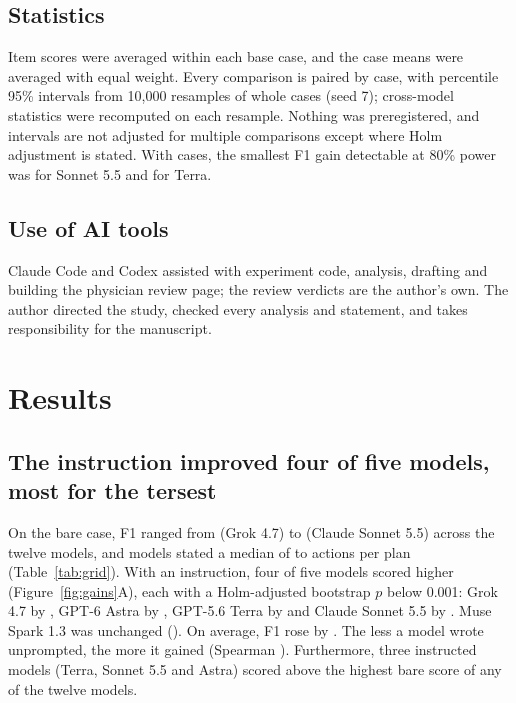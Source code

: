 \documentclass[11pt]{article}
\begin{document}
\subsection*{Statistics}
\label{sec:statistics}
Item scores were averaged within each base case, and the \nCases{} case means were averaged with
equal weight. Every comparison is paired by case, with percentile 95\% intervals from 10,000
resamples of whole cases (seed 7); cross-model statistics were recomputed on each resample. Nothing
was preregistered, and intervals are not adjusted for multiple comparisons except where Holm
adjustment is stated. With \nCases{} cases, the smallest F1 gain detectable at 80\% power was
\covMdeSonnet{} for Sonnet 5.5 and \covMdeTerra{} for Terra.

\subsection*{Use of AI tools}
Claude Code and Codex assisted with experiment code, analysis, drafting and building the physician
review page; the review verdicts are the author's own. The author directed the study, checked every analysis and statement, and takes responsibility for the manuscript.

\section*{Results}
\subsection*{The instruction improved four of five models, most for the tersest}
\label{sec:grid}
\label{sec:spread}
On the bare case, F1 ranged from \covFGrokBare{} (Grok 4.7) to \covFSonnetBare{} (Claude Sonnet
5.5) across the twelve models, and models stated a median of \covAGrokBare{} to \covAMuseBare{}
actions per plan (Table~\ref{tab:grid}). With an instruction, four of five models scored higher
(Figure~\ref{fig:gains}A), each with a Holm-adjusted bootstrap $p$ below 0.001: Grok 4.7 by
\covDPromptGrokThorough{}, GPT-6 Astra by \covDPromptAstraExh{}, GPT-5.6 Terra by
\covDPromptTerra{} and Claude Sonnet 5.5 by \covDPromptSonnet{}. Muse Spark 1.3 was unchanged
(\covDPromptMuseThorough{}). On average, F1 rose by \covPaperGridMeanGain{}
\covPaperGridMeanGainCI{}. The less a model wrote unprompted, the more it gained (Spearman
\covPaperGridRhoGainActions{} \covPaperGridRhoGainActionsCI{}). Furthermore, three instructed
models (Terra, Sonnet 5.5 and Astra) scored above the highest bare score of any of the twelve
models.
\end{document}
